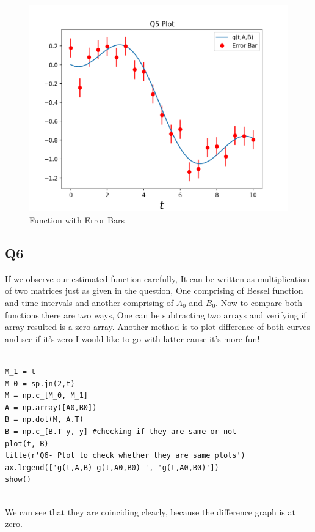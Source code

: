\documentclass[12pt, a4paper]{report}
\begin{document}
\begin{figure}[!tbh]
   	\centering
   	\includegraphics[scale=0.5]{Qn5.png}
   	\caption{Function with Error Bars}
   	\label{fig:errorbars}
   \end{figure}

  
 \subsection{Q6}
If we observe our estimated function carefully, It can be written as multiplication of two matrices just as given in the question, One comprising of Bessel function and time intervals and another comprising of $A_0$ and $B_0$. Now to compare both functions there are two ways, One can be subtracting two arrays and verifying if array resulted is a zero array. Another method is to plot difference of both curves and see if it's zero I would like to go with latter cause it's more fun!
 \begin{Verbatim}
 
M_1 = t
M_0 = sp.jn(2,t)
M = np.c_[M_0, M_1]
A = np.array([A0,B0])
B = np.dot(M, A.T)
B = np.c_[B.T-y, y] #checking if they are same or not
plot(t, B)
title(r'Q6- Plot to check whether they are same plots')
ax.legend(['g(t,A,B)-g(t,A0,B0) ', 'g(t,A0,B0)'])
show()


\end{Verbatim}

We can see that they are coinciding clearly, because the difference graph is at zero.
\end{document}
